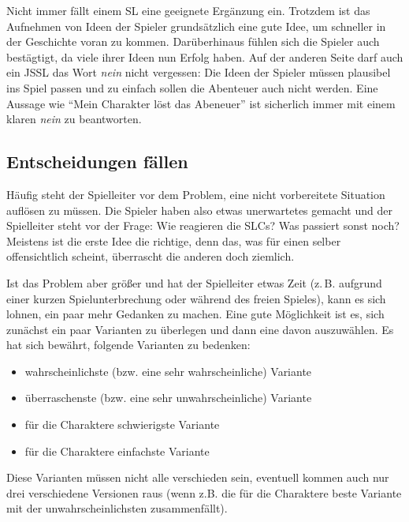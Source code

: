 Nicht immer fällt einem SL eine geeignete Ergänzung ein. Trotzdem ist
das Aufnehmen von Ideen der Spieler grundsätzlich eine gute Idee, um schneller
in der Geschichte voran zu kommen. Darüberhinaus fühlen sich die Spieler auch
bestägtigt, da viele ihrer Ideen nun Erfolg haben. Auf der anderen Seite darf
auch ein JSSL das Wort \emph{nein} nicht vergessen: Die Ideen der Spieler müssen
plausibel ins Spiel passen und zu einfach sollen die Abenteuer auch nicht
werden. Eine Aussage wie ``Mein Charakter löst das Abeneuer'' ist sicherlich
immer mit einem klaren \emph{nein} zu beantworten.

\subsection{Entscheidungen fällen}
Häufig steht der Spielleiter vor dem Problem, eine nicht vorbereitete Situation
auflösen zu müssen. Die Spieler haben also etwas unerwartetes gemacht und der
Spielleiter steht vor der Frage: Wie reagieren die SLCs? Was passiert sonst
noch? Meistens ist die erste Idee die richtige, denn das, was für einen selber offensichtlich scheint, überrascht die anderen doch ziemlich.

Ist das Problem aber größer und hat der Spielleiter etwas Zeit (z.\,B. aufgrund einer kurzen Spielunterbrechung oder während des freien Spieles), kann es sich lohnen, ein paar mehr Gedanken zu machen. Eine gute Möglichkeit ist es, sich zunächst ein paar Varianten zu
überlegen und dann eine davon auszuwählen. Es hat sich bewährt, folgende
Varianten zu bedenken:

\begin{itemize}
\item wahrscheinlichste (bzw. eine sehr wahrscheinliche) Variante
\item überraschenste (bzw. eine sehr unwahrscheinliche) Variante
\item für die Charaktere schwierigste Variante
\item für die Charaktere einfachste Variante
\end{itemize}

Diese Varianten müssen nicht alle verschieden sein, eventuell kommen auch
nur drei verschiedene Versionen raus (wenn z.B. die für die Charaktere beste
Variante mit der unwahrscheinlichsten zusammenfällt).

